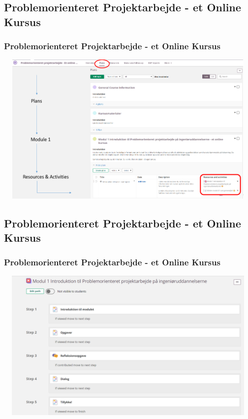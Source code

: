 \documentclass[t, aspectratio=169]{beamer}
\begin{document}
\subsection{Problemorienteret Projektarbejde - et Online Kursus}
\begin{frame}[fragile]
  \frametitle{Problemorienteret Projektarbejde - et Online Kursus}
  \vspace{-2mm}
  \begin{center}
    \includegraphics[width=134mm, height=75mm]{figs/itslearning/proonlineplan.png}
  \end{center}
\end{frame}

\subsection{Problemorienteret Projektarbejde - et Online Kursus}
\begin{frame}[fragile]
  \frametitle{Problemorienteret Projektarbejde - et Online Kursus}
  \vspace{-2mm}
  \begin{center}
    \includegraphics[width=134mm, height=75mm]{figs/itslearning/module1.png}
  \end{center}
\end{frame}
\end{document}
